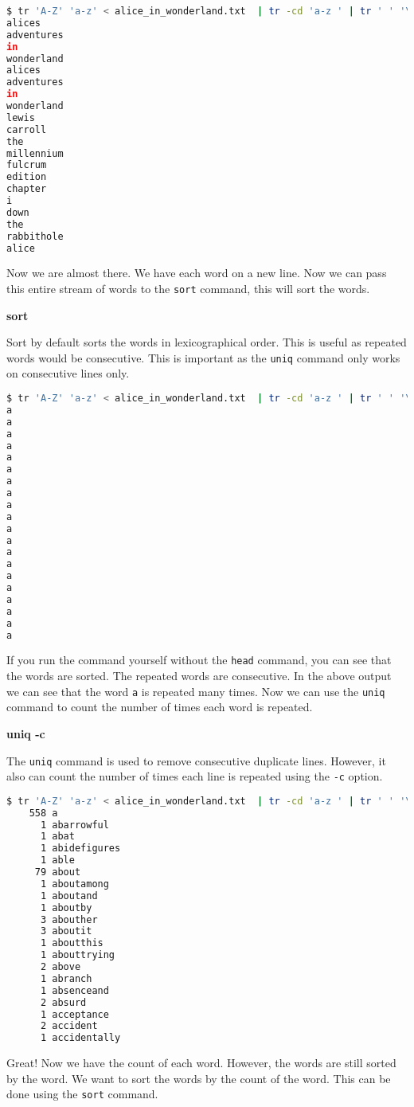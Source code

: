 \begin{lstlisting}[language=bash]
$ tr 'A-Z' 'a-z' < alice_in_wonderland.txt  | tr -cd 'a-z ' | tr ' ' '\n' | grep . | head -20
alices
adventures
in
wonderland
alices
adventures
in
wonderland
lewis
carroll
the
millennium
fulcrum
edition
chapter
i
down
the
rabbithole
alice
\end{lstlisting}

Now we are almost there. We have each word on a new line. Now we can
pass this entire stream of words to the \lstinline|sort| command, this
will sort the words.

\textbf{sort}

Sort by default sorts the words in lexicographical order. This is
useful as repeated words would be consecutive. This is important
as the \lstinline|uniq| command only works on consecutive lines only.

\begin{lstlisting}[language=bash]
$ tr 'A-Z' 'a-z' < alice_in_wonderland.txt  | tr -cd 'a-z ' | tr ' ' '\n' | grep . | sort | head -20
a
a
a
a
a
a
a
a
a
a
a
a
a
a
a
a
a
a
a
a
\end{lstlisting}

If you run the command yourself without the \lstinline|head| command, you
can see that the words are sorted. The repeated words are consecutive.
In the above output we can see that the word \lstinline|a| is repeated
many times. Now we can use the \lstinline|uniq| command to count the
number of times each word is repeated.

\textbf{uniq -c}

The \lstinline|uniq| command is used to remove consecutive duplicate lines.
However, it also can count the number of times each line is repeated
using the \lstinline|-c| option.

\begin{lstlisting}[language=bash]
$ tr 'A-Z' 'a-z' < alice_in_wonderland.txt  | tr -cd 'a-z ' | tr ' ' '\n' | grep . | sort | uniq -c | head -20
    558 a
      1 abarrowful
      1 abat
      1 abidefigures
      1 able
     79 about
      1 aboutamong
      1 aboutand
      1 aboutby
      3 abouther
      3 aboutit
      1 aboutthis
      1 abouttrying
      2 above
      1 abranch
      1 absenceand
      2 absurd
      1 acceptance
      2 accident
      1 accidentally
\end{lstlisting}

Great! Now we have the count of each word. However, the words are
still sorted by the word. We want to sort the words by the count
of the word. This can be done using the \lstinline|sort| command.

